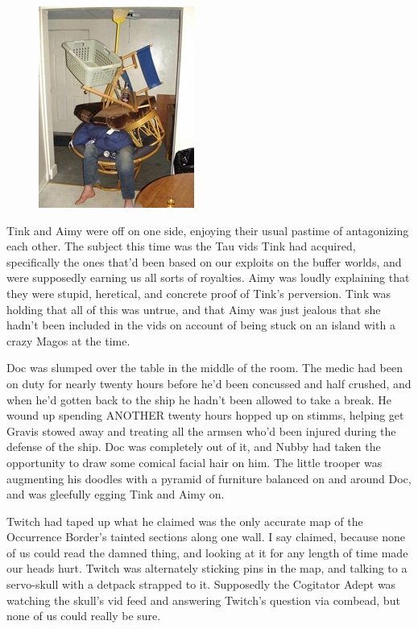 \begin{figure}
	\begin{center}
		\includegraphics[width=\figwidth]{pics/15/2.png}
	\end{center}
\end{figure}
Tink and Aimy were off on one side, enjoying their usual pastime of antagonizing each other. 
The subject this time was the Tau vids Tink had acquired, specifically the ones that'd been based on our exploits on the buffer worlds, and were supposedly earning us all sorts of royalties. 
Aimy was loudly explaining that they were stupid, heretical, and concrete proof of Tink's perversion. 
Tink was holding that all of this was untrue, and that Aimy was just jealous that she hadn't been included in the vids on account of being stuck on an island with a crazy Magos at the time.

Doc was slumped over the table in the middle of the room. 
The medic had been on duty for nearly twenty hours before he'd been concussed and half crushed, and when he'd gotten back to the ship he hadn't been allowed to take a break. 
He wound up spending ANOTHER twenty hours hopped up on stimms, helping get Gravis stowed away and treating all the armsen who'd been injured during the defense of the ship. 
Doc was completely out of it, and Nubby had taken the opportunity to draw some comical facial hair on him. 
The little trooper was augmenting his doodles with a pyramid of furniture balanced on and around Doc, and was gleefully egging Tink and Aimy on.

Twitch had taped up what he claimed was the only accurate map of the Occurrence Border's tainted sections along one wall. 
I say claimed, because none of us could read the damned thing, and looking at it for any length of time made our heads hurt. 
Twitch was alternately sticking pins in the map, and talking to a servo-skull with a detpack strapped to it. 
Supposedly the Cogitator Adept was watching the skull's vid feed and answering Twitch's question via combead, but none of us could really be sure.

